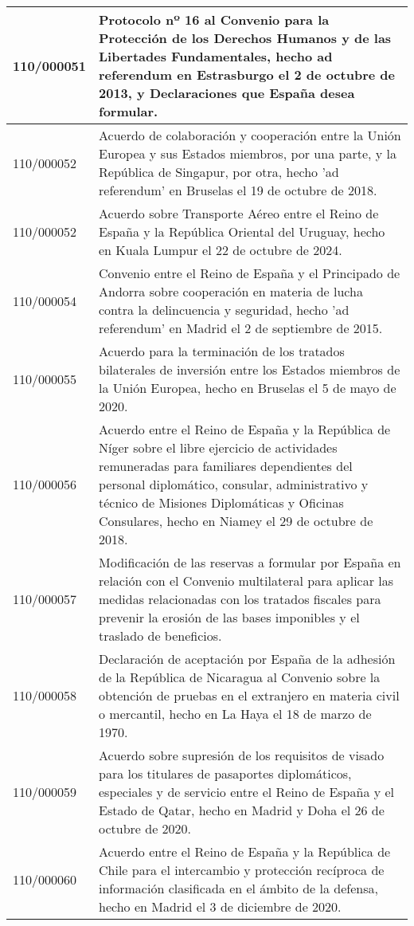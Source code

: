 {\begin{table}[H]
\begin{center}
\begin{tabularx}{\linewidth}{| l | X |}
\hline
110/000051 & Protocolo nº 16 al Convenio para la Protección de los Derechos Humanos y de las Libertades Fundamentales, hecho ad referendum en Estrasburgo el 2 de octubre de 2013, y Declaraciones que España desea formular. \\
\hline
110/000052 & Acuerdo de colaboración y cooperación entre la Unión Europea y sus Estados miembros, por una parte, y la República de Singapur, por otra, hecho 'ad referendum' en Bruselas el 19 de octubre de 2018. \\
\hline
110/000052 & Acuerdo sobre Transporte Aéreo entre el Reino de España y la República Oriental del Uruguay, hecho en Kuala Lumpur el 22 de octubre de 2024. \\
\hline
110/000054 & Convenio entre el Reino de España y el Principado de Andorra sobre cooperación en materia de lucha contra la delincuencia y seguridad, hecho 'ad referendum' en Madrid el 2 de septiembre de 2015. \\
\hline
110/000055 & Acuerdo para la terminación de los tratados bilaterales de inversión entre los Estados miembros de la Unión Europea, hecho en Bruselas el 5 de mayo de 2020. \\
\hline
110/000056 & Acuerdo entre el Reino de España y la República de Níger sobre el libre ejercicio de actividades remuneradas para familiares dependientes del personal diplomático, consular, administrativo y técnico de Misiones Diplomáticas y Oficinas Consulares, hecho en Niamey el 29 de octubre de 2018. \\
\hline
110/000057 & Modificación de las reservas a formular por España en relación con el Convenio multilateral para aplicar las medidas relacionadas con los tratados fiscales para prevenir la erosión de las bases imponibles y el traslado de beneficios. \\
\hline
110/000058 & Declaración de aceptación por España de la adhesión de la República de Nicaragua al Convenio sobre la obtención de pruebas en el extranjero en materia civil o mercantil, hecho en La Haya el 18 de marzo de 1970. \\
\hline
110/000059 & Acuerdo sobre supresión de los requisitos de visado para los titulares de pasaportes diplomáticos, especiales y de servicio entre el Reino de España y el Estado de Qatar, hecho en Madrid y Doha el 26 de octubre de 2020. \\
\hline
110/000060 & Acuerdo entre el Reino de España y la República de Chile para el intercambio y protección recíproca de información clasificada en el ámbito de la defensa, hecho en Madrid el 3 de diciembre de 2020. \\

\end{tabularx}
\end{center}
\end{table}}
